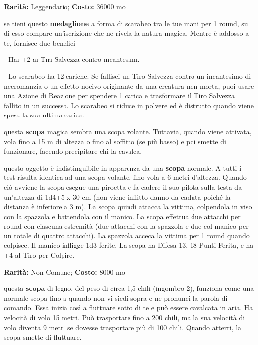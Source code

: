 \begin{multicols}{2}
\textbf{Rarità:} Leggendario; \textbf{Costo:} 36000 mo

se tieni questo \textbf{medaglione} a forma di scarabeo tra le tue mani per 1 round, su di esso compare un'iscrizione che ne rivela la natura magica. Mentre è addosso a te, fornisce due benefici

- Hai +2 ai Tiri Salvezza contro incantesimi.

- Lo scarabeo ha 12 cariche. Se fallisci un Tiro Salvezza contro un incantesimo di necromanzia o un effetto nocivo originante da una creatura non morta, puoi usare una Azione di Reazione per spendere 1 carica e trasformare il Tiro Salvezza fallito in un successo. Lo scarabeo si riduce in polvere ed è distrutto quando viene spesa la sua ultima carica.


questa \textbf{scopa} magica sembra una scopa volante. Tuttavia, quando viene attivata, vola fino a 15 m di altezza o fino al soffitto (se più basso) e poi smette di funzionare, facendo precipitare chi la cavalca.


questo oggetto è indistinguibile in apparenza da una \textbf{scopa} normale. A tutti i test risulta identica ad una scopa volante, fino vola a 6 metri d'altezza. Quando ciò avviene la scopa esegue una piroetta e fa cadere il suo pilota sulla testa da un'altezza di 1d4+5 x 30 cm (non viene inflitto danno da caduta poiché la distanza è inferiore a 3 m). La scopa quindi attacca la vittima, colpendola in viso con la spazzola e battendola con il manico. La scopa effettua due attacchi per round con ciascuna estremità (due attacchi con la spazzola e due col manico per un totale di quattro attacchi). La spazzola acceca la vittima per 1 round quando colpisce. Il manico infligge 1d3 ferite. La scopa ha Difesa 13, 18 Punti Ferita, e ha +4 al Tiro per Colpire.


\textbf{Rarità:} Non Comune; \textbf{Costo:} 8000 mo

questa \textbf{scopa} di legno, del peso di circa 1,5 chili (ingombro 2), funziona come una normale scopa fino a quando non vi siedi sopra e ne pronunci la parola di comando. Essa inizia così a fluttuare sotto di te e può essere cavalcata in aria. Ha velocità di volo 15 metri. Può trasportare fino a 200 chili, ma la sua velocità di volo diventa 9 metri se dovesse trasportare più di 100 chili. Quando atterri, la scopa smette di fluttuare.


\end{multicols}
